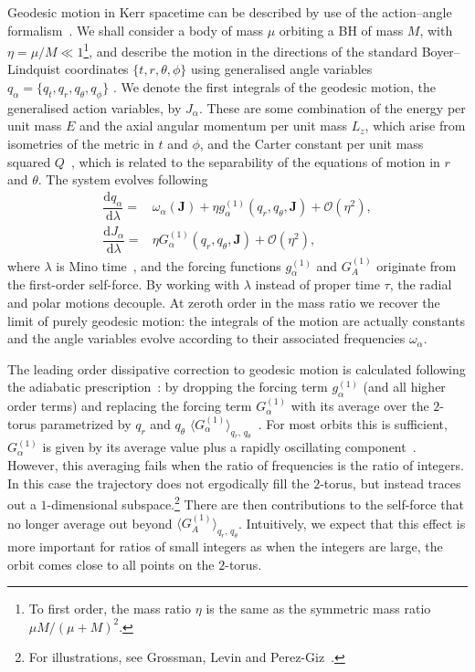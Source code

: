 \documentclass[aps,prd,amsfonts,amssymb,amsmath,nofootinbib,reprint,showpacs,superscriptaddress,twocolumn]{revtex4}
\newcommand{\dd}{\ensuremath{\mathrm{d}}}
\newcommand{\diff}[2]{\ensuremath{\dfrac{\dd {#1}}{\dd {#2}}}}
\newcommand{\order}[1]{\ensuremath{\mathcal{O}({#1})}}
\begin{document}
Geodesic motion in Kerr spacetime can be described by use of the action--angle formalism~\cite{Goldstein2002}. %
We shall consider a body of mass $\mu$ orbiting a BH of mass $M$, with $\eta = \mu/M \ll 1$\footnote{To first order, the mass ratio $\eta$ is the same as the symmetric mass ratio $\mu M/(\mu+M)^2$.}, and describe the motion in the directions of the standard Boyer--Lindquist coordinates $\{t,r,\theta,\phi\}$ using generalised angle variables $q_\alpha = \{q_t,q_r,q_\theta,q_\phi\}$ \citep{Hinderer2008}. We denote the first integrals of the geodesic motion, the generalised action variables, by $J_\alpha$. These are some combination of the energy per unit mass $E$ and the axial angular momentum per unit mass $L_z$, which arise from isometries of the metric in $t$ and $\phi$, and the Carter constant per unit mass squared $Q$~\cite{Carter1968}, which is related to the separability of the equations of motion in $r$ and $\theta$. The system evolves following~\cite{Flanagan2012}
\begin{subequations}
\label{eq:Mino-E-o-M}
\begin{align}
\diff{q_\alpha}{\lambda} = {} & \omega_\alpha(\boldsymbol{J}) + \eta g_\alpha^{(1)}(q_r,q_\theta,\boldsymbol{J}) + \order{\eta^2}, \\
\diff{J_\alpha}{\lambda} = {} & \eta G_\alpha^{(1)}(q_r,q_\theta,\boldsymbol{J}) + \order{\eta^2},
\end{align}
\end{subequations}
where $\lambda$ is Mino time~\cite{Mino2003}, and the forcing functions $g_\alpha^{(1)}$ and $G_A^{(1)}$ originate from the first-order self-force. By working with $\lambda$ instead of proper time $\tau$, the radial and polar motions decouple. At zeroth order in the mass ratio we recover the limit of purely geodesic motion: the integrals of the motion are actually constants and the angle variables evolve according to their associated frequencies $\omega_\alpha$.

The leading order dissipative correction to geodesic motion is calculated following the adiabatic prescription~\cite{Hinderer2008}: by dropping the forcing term $g_\alpha^{(1)}$ (and all higher order terms) and replacing the forcing term $G_\alpha^{(1)}$ with its average over the $2$-torus parametrized by $q_r$ and $q_\theta$ $\langle G_\alpha^{(1)}\rangle_{q_r,\,q_\theta}$~\cite{Drasco2005}. For most orbits this is sufficient, $G_\alpha^{(1)}$ is given by its average value plus a rapidly oscillating component~\cite{Arnold1988}. %
However, this averaging fails when the ratio of frequencies is the ratio of integers. In this case the trajectory does not ergodically fill the $2$-torus, but instead traces out a $1$-dimensional subspace.\footnote{For illustrations, see Grossman, Levin and Perez-Giz~\cite{Grossman2012}.} There are then contributions to the self-force that no longer average out beyond $\langle G_A^{(1)}\rangle_{q_r,\,q_\theta}$. Intuitively, we expect that this effect is more important for ratios of small integers as when the integers are large, the orbit comes close to all points on the $2$-torus.
\end{document}
